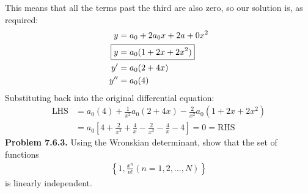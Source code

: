 \documentclass{article}
\begin{document}
This means that all the terms past the third are also zero, so our solution is, as required:
\begin{equation*}
\begin{aligned}
	y &= a_0 + 2a_0x + 2a+0x^2 \\
	\Aboxed{ y &= a_0(1+2x+2x^2)} \\
	y' &= a_0(2 + 4x) \\
	y'' &= a_0(4)
\end{aligned}
\end{equation*}
Substituting back into the original differential equation:
\begin{equation*}
\begin{aligned}
	\text{LHS} &= a_0(4) + \frac{1}{x^2}a_0(2 + 4x)-\frac{2}{x^2}a_0(1+2x+2x^2) \\
	&= a_0\left[4+\frac{2}{x^2}+\frac{4}{x}-\frac{2}{x^2}-\frac{4}{x}-4\right] = 0 = \text{RHS}
\end{aligned}
\end{equation*}
\textbf{Problem 7.6.3.} Using the Wronskian determinant, show that the set of functions
\begin{equation*}
\begin{aligned}
	\left\{1, \frac{x^n}{n!}(n = 1, 2, \dots, N)\right\}
\end{aligned}
\end{equation*}
is linearly independent.
\end{document}
